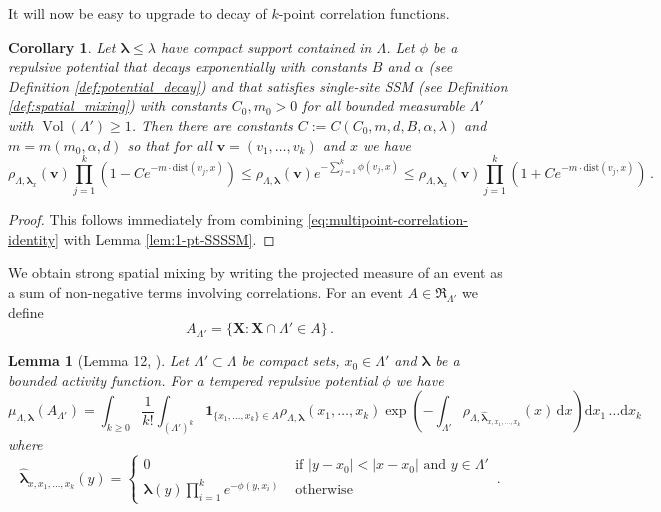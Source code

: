 \documentclass[10pt]{amsart}
\newtheorem{corollary}[theorem]{Corollary}
\newtheorem{lemma}[theorem]{Lemma}
\theoremstyle{definition}
\theoremstyle{remark}
\newcommand{\events}{\mathfrak{R}}
\newcommand{\one}{\boldsymbol{1}}
\newcommand{\bX}{\mathbf{X}}
\newcommand{\Vol}{\operatorname{Vol}}
\newcommand{\blambda}{{\boldsymbol{\lambda}}}
\newcommand{\dist}{\mathrm{dist}}
\newcommand{\diff}{\mathrm{d}}
\begin{document}
	It will now be easy to upgrade to decay of $k$-point correlation functions.  
	\begin{corollary}\label{cor:multipoint-SSSSM}
		Let $\blambda \leq \lambda$ have compact support contained in $\Lambda$.   Let $\phi$ be a repulsive potential that decays exponentially with constants $B$ and $\alpha$ (see Definition \ref{def:potential_decay}) and that satisfies single-site SSM (see Definition \ref{def:spatial_mixing}) with constants $C_0,m_0 > 0$ for all bounded measurable $\Lambda'$ with $\Vol(\Lambda') \geq 1$.  Then there are constants $C := C(C_0,m,d,B,\alpha,\lambda)$ and $m = m(m_0,\alpha,d)$ so that for all $\mathbf{v} = (v_1,\ldots,v_k)$ and $x$ we have 
		\begin{equation*}
			\rho_{\Lambda,\blambda_x}(\mathbf{v}) \prod_{j = 1}^k \left( 1 - C e^{-m \cdot\dist(v_j,x)}\right) \leq  \rho_{
				\Lambda,\blambda}(\mathbf{v}) e^{-\sum_{j =1}^k \phi(v_j,x)} \leq \rho_{\Lambda,\blambda_x}(\mathbf{v}) \prod_{j = 1}^k \left( 1 + C e^{-m \cdot\dist(v_j,x)}\right)\,.
		\end{equation*}
	\end{corollary}
	\begin{proof}
		This follows immediately from combining \eqref{eq:multipoint-correlation-identity} with Lemma \ref{lem:1-pt-SSSSM}.
	\end{proof}
	
	
	We obtain strong spatial mixing by writing the projected measure of an event as a sum of non-negative terms involving correlations.  For an event $A \in \events_{\Lambda'}$ we  define 
	$$A_{\Lambda'} = \{\bX : \bX \cap \Lambda' \in A\}\,.$$
	
	\begin{lemma}[Lemma 12, \cite{michelen2022strong}] \label{lem:ssm-via-densities}
		Let $\Lambda' \subset \Lambda$ be compact sets, $x_0 \in \Lambda'$ and $\blambda$ be a bounded activity function.  For a tempered repulsive potential $\phi$ we have $$\mu_{\Lambda,\blambda}(A_{\Lambda'}) = \int_{k \geq 0} \frac{1}{k!} \int_{(\Lambda')^k} \one_{ \{x_1,\ldots,x_k\} \in A} \rho_{\Lambda,\blambda}(x_1,\ldots,x_k) \exp\left(-\int_{\Lambda'} \rho_{\Lambda,\widehat{\blambda}_{x,x_1,\ldots,x_k}}(x) \,\diff x \right) \diff x_1 \, \ldots \diff x_k$$
		where \begin{equation*}
			\widehat{\blambda}_{x,x_1,\ldots,x_k}(y) = \begin{cases}
				0 & \text{ if } |y - x_0| < |x - x_0| \text{ and }y \in \Lambda' \\
				\blambda(y) \prod_{i = 1}^k e^{-\phi(y,x_i)} & \text{ otherwise }
			\end{cases} \,.
		\end{equation*}
	\end{lemma}
	
\end{document}
